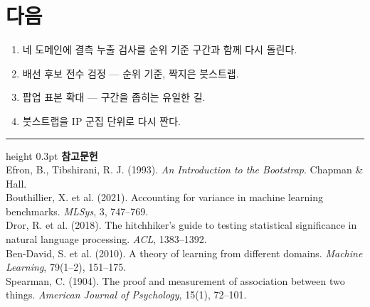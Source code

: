 \documentclass[10pt]{article}
\begin{document}
\section{다음}

\begin{enumerate}[leftmargin=1.3em,itemsep=0.15em]
\item 네 도메인에 결측 누출 검사를 순위 기준 구간과 함께 다시 돌린다.
\item 배선 후보 전수 검정 --- 순위 기준, 짝지은 붓스트랩.
\item 팝업 표본 확대 --- 구간을 좁히는 유일한 길.
\item 붓스트랩을 IP 군집 단위로 다시 짠다.
\end{enumerate}

\vspace{0.6em}
\hrule height 0.3pt
\vspace{0.5em}
{\footnotesize
\textbf{참고문헌}\\[0.3em]
Efron, B., Tibshirani, R. J. (1993). \emph{An Introduction to the Bootstrap}.
Chapman \& Hall.\\[0.15em]
Bouthillier, X. et al. (2021). Accounting for variance in machine learning
benchmarks. \emph{MLSys}, 3, 747--769.\\[0.15em]
Dror, R. et al. (2018). The hitchhiker's guide to testing statistical
significance in natural language processing. \emph{ACL}, 1383--1392.\\[0.15em]
Ben-David, S. et al. (2010). A theory of learning from different domains.
\emph{Machine Learning}, 79(1--2), 151--175.\\[0.15em]
Spearman, C. (1904). The proof and measurement of association between two things.
\emph{American Journal of Psychology}, 15(1), 72--101.
}
\end{document}
